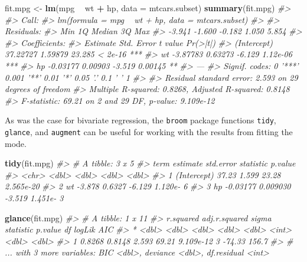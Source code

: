 \documentclass[]{book}
\newenvironment{Shaded}{\begin{snugshade}}{\end{snugshade}}
\newcommand{\CommentTok}[1]{\textcolor[rgb]{0.56,0.35,0.01}{\textit{#1}}}
\newcommand{\DataTypeTok}[1]{\textcolor[rgb]{0.13,0.29,0.53}{#1}}
\newcommand{\KeywordTok}[1]{\textcolor[rgb]{0.13,0.29,0.53}{\textbf{#1}}}
\newcommand{\NormalTok}[1]{#1}
\newcommand{\OperatorTok}[1]{\textcolor[rgb]{0.81,0.36,0.00}{\textbf{#1}}}
\newcommand{\StringTok}[1]{\textcolor[rgb]{0.31,0.60,0.02}{#1}}
\theoremstyle{definition}
\theoremstyle{definition}
\theoremstyle{definition}
\theoremstyle{remark}
\begin{document}
\begin{Shaded}
\begin{Highlighting}[]
\NormalTok{fit.mpg <-}\StringTok{ }\KeywordTok{lm}\NormalTok{(mpg }\OperatorTok{~}\StringTok{ }\NormalTok{wt }\OperatorTok{+}\StringTok{ }\NormalTok{hp, }\DataTypeTok{data =}\NormalTok{ mtcars.subset)}
\KeywordTok{summary}\NormalTok{(fit.mpg)}
\CommentTok{#> }
\CommentTok{#> Call:}
\CommentTok{#> lm(formula = mpg ~ wt + hp, data = mtcars.subset)}
\CommentTok{#> }
\CommentTok{#> Residuals:}
\CommentTok{#>    Min     1Q Median     3Q    Max }
\CommentTok{#> -3.941 -1.600 -0.182  1.050  5.854 }
\CommentTok{#> }
\CommentTok{#> Coefficients:}
\CommentTok{#>             Estimate Std. Error t value Pr(>|t|)    }
\CommentTok{#> (Intercept) 37.22727    1.59879  23.285  < 2e-16 ***}
\CommentTok{#> wt          -3.87783    0.63273  -6.129 1.12e-06 ***}
\CommentTok{#> hp          -0.03177    0.00903  -3.519  0.00145 ** }
\CommentTok{#> ---}
\CommentTok{#> Signif. codes:  0 '***' 0.001 '**' 0.01 '*' 0.05 '.' 0.1 ' ' 1}
\CommentTok{#> }
\CommentTok{#> Residual standard error: 2.593 on 29 degrees of freedom}
\CommentTok{#> Multiple R-squared:  0.8268, Adjusted R-squared:  0.8148 }
\CommentTok{#> F-statistic: 69.21 on 2 and 29 DF,  p-value: 9.109e-12}
\end{Highlighting}
\end{Shaded}

As was the case for bivariate regression, the \texttt{broom} package
functions \texttt{tidy}, \texttt{glance}, and \texttt{augment} can be
useful for working with the results from fitting the mode.

\begin{Shaded}
\begin{Highlighting}[]
\KeywordTok{tidy}\NormalTok{(fit.mpg)}
\CommentTok{#> # A tibble: 3 x 5}
\CommentTok{#>   term         estimate std.error statistic   p.value}
\CommentTok{#>   <chr>           <dbl>     <dbl>     <dbl>     <dbl>}
\CommentTok{#> 1 (Intercept)  37.23     1.599       23.28  2.565e-20}
\CommentTok{#> 2 wt           -3.878    0.6327      -6.129 1.120e- 6}
\CommentTok{#> 3 hp           -0.03177  0.009030    -3.519 1.451e- 3}
\end{Highlighting}
\end{Shaded}

\begin{Shaded}
\begin{Highlighting}[]
\KeywordTok{glance}\NormalTok{(fit.mpg)}
\CommentTok{#> # A tibble: 1 x 11}
\CommentTok{#>   r.squared adj.r.squared sigma statistic   p.value    df logLik   AIC}
\CommentTok{#> *     <dbl>         <dbl> <dbl>     <dbl>     <dbl> <int>  <dbl> <dbl>}
\CommentTok{#> 1    0.8268        0.8148 2.593     69.21 9.109e-12     3 -74.33 156.7}
\CommentTok{#> # ... with 3 more variables: BIC <dbl>, deviance <dbl>, df.residual <int>}
\end{Highlighting}
\end{Shaded}
\end{document}
